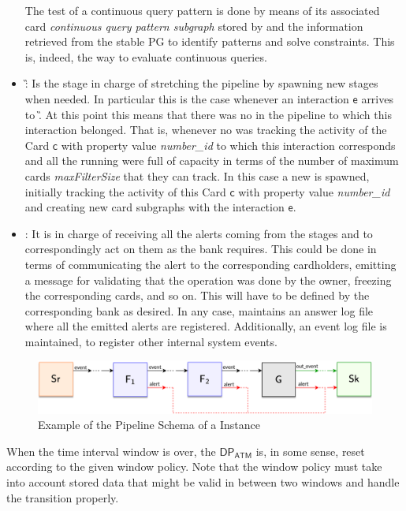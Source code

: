 \begin{itemize}
    The test of a continuous query pattern is done by means of its associated card \emph{continuous query pattern subgraph} stored by \F and the information retrieved from the stable PG to identify patterns and solve constraints. This is, indeed, the way to evaluate continuous queries.
    
    \item \generator \G: Is the stage in charge of stretching the pipeline by spawning new \filter \F stages when needed. In particular this is the case whenever an interaction $\mathsf{e}$ arrives to \G. At this point this means that there was no \F in the pipeline to which this interaction belonged. That is, whenever no \F was tracking the activity of the Card $\mathsf{c}$ with property value \emph{number\_id} to which this interaction corresponds and all the running \F were full of capacity in terms of the number of maximum cards \emph{maxFilterSize} that they can track. In this case a new \F is spawned, initially tracking the activity of this Card $\mathsf{c}$ with property value \emph{number\_id} and creating new card subgraphs with the interaction $\mathsf{e}$. 
    \item \sink \Sk: It is in charge of receiving all the alerts coming from the \filter stages and to correspondingly act on them as the bank requires. This could be done in terms of communicating the alert to the corresponding cardholders, emitting a message for validating that the operation was done by the owner, freezing the corresponding cards, and so on. This will have to be defined by the corresponding bank as desired. In any case, \Sk maintains an answer log file where all the emitted alerts are registered. Additionally, an event log file is maintained, to register other internal system events.
\end{itemize}


\begin{figure}[H]
    \centering
    \includegraphics[scale = 0.8]{images/3-Engine/DP-2f.png}
    \caption{Example of the Pipeline Schema of a \DPATM Instance}
    \label{img:pipeline-schema}
\end{figure}


When the time interval window is over, the $\mathsf{DP_{ATM}}$ is, in some sense, reset according to the given window policy. Note that the window policy must take into account stored data that might be valid in between two windows and handle the transition properly.

